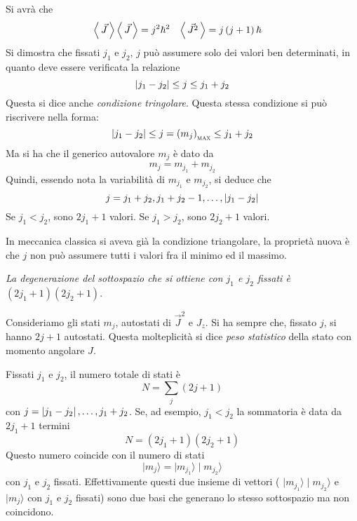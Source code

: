 Si avrà che
\begin{align}
\left\langle\, \vec{J} \,\right\rangle\left\langle\, \vec{J} \,\right\rangle &= j^{2} \hbar ^{2} & \left\langle\, \vec{J^{2}} \,\right\rangle &= 
j\left(j+1\right)\hbar 
\end{align}
Si dimostra che fissati $j_{1}$ e $j_{2}$, $j$ può assumere solo dei valori ben
determinati, in quanto deve essere verificata la relazione
\begin{equation}
\left| j_{1} - j_{2} \right| \leq j \leq j_{1} + j_{2} 
\end{equation}
Questa si dice anche \textit{condizione tringolare}. Questa stessa condizione si
può riscrivere nella forma:
\begin{equation}
\left| j_{1} - j_{2} \right| \leq j = \left(m_{j}\right)_\text{\scshape max} \leq j_{1} 
+ j_{2}
\end{equation}
Ma si ha che il generico autovalore $m_{j}$ è dato da
\begin{equation}
m_{j} = m_{j_{1}} + m_{j_{2}}
\end{equation}
Quindi, essendo nota la variabilità di $m_{j_{1}}$ e $m_{j_{2}}$, si deduce che
\begin{equation}
j = j_{1} + j_{2}, j_{1} + j_{2}-1, \dots , \left| j_{1} - j_{2} \right|
\end{equation}
Se $j_{1}<j_{2}$, sono $2j_{1} + 1$ valori. Se $j_{1}>j_{2}$, sono $2j_{2} + 1$
valori.

In meccanica classica si aveva già la condizione triangolare, la proprietà 
nuova
è che $j$ non può assumere tutti i valori fra il minimo ed il massimo. 

\textit{La degenerazione del sottospazio che si ottiene con $j_{1}$ e $j_{2}$
fissati è $\left(2j_{1} + 1\right)\left(2j_{2}+1\right)$}.

Consideriamo gli stati $m_{j}$, autostati di $\vec{J}^{2}$ e $J_{z}$. Si ha
sempre che, fissato $j$, si hanno $2j +1$ autostati. Questa molteplicità si 
dice
\textit{peso statistico} della stato con momento angolare $J$.

Fissati $j_{1}$ e $j_{2}$, il numero totale di stati è 
\begin{equation}
N = \sum _{j} \left(2j +1\right)
\end{equation}
con $j=\left| j_{1} - j_{2} \right|, \dots , j_{1} +j_{2}$.
Se, ad esempio, $j_{1}<j_{2}$ la sommatoria è data da $2j_{1} + 1$ termini
\begin{equation}
N = \left(2j_{1} + 1\right)\left(2j_{2}+1\right)
\end{equation}
Questo numero coincide con il numero di stati 
\begin{equation}
\mid m_{j}\rangle = \mid m_{j_{1}}\rangle \mid m_{j_{2}}\rangle
\end{equation}
con $j_{1}$ e $j_{2}$ fissati. Effettivamente questi due insieme di vettori (
$\mid m_{j_{1}}\rangle \mid m_{j_{2}}\rangle$ e $\mid m_{j}\rangle$ con $j_{1}$
e $j_{2}$ fissati) sono due basi che generano lo stesso sottospazio ma non 
coincidono.

